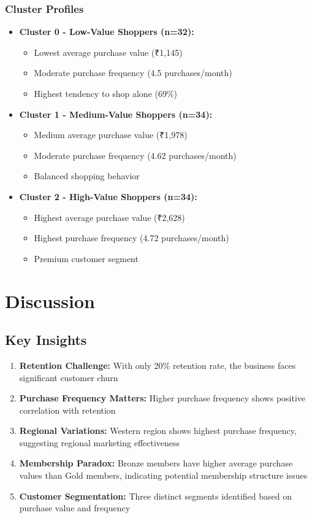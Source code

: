 \documentclass[12pt,a4paper]{article}
\begin{document}
\subsubsection{Cluster Profiles}
\begin{itemize}
    \item \textbf{Cluster 0 - Low-Value Shoppers (n=32):}
    \begin{itemize}
        \item Lowest average purchase value (₹1,145)
        \item Moderate purchase frequency (4.5 purchases/month)
        \item Highest tendency to shop alone (69\%)
    \end{itemize}
    
    \item \textbf{Cluster 1 - Medium-Value Shoppers (n=34):}
    \begin{itemize}
        \item Medium average purchase value (₹1,978)
        \item Moderate purchase frequency (4.62 purchases/month)
        \item Balanced shopping behavior
    \end{itemize}
    
    \item \textbf{Cluster 2 - High-Value Shoppers (n=34):}
    \begin{itemize}
        \item Highest average purchase value (₹2,628)
        \item Highest purchase frequency (4.72 purchases/month)
        \item Premium customer segment
    \end{itemize}
\end{itemize}

\section{Discussion}

\subsection{Key Insights}
\begin{enumerate}
    \item \textbf{Retention Challenge:} With only 20\% retention rate, the business faces significant customer churn
    \item \textbf{Purchase Frequency Matters:} Higher purchase frequency shows positive correlation with retention
    \item \textbf{Regional Variations:} Western region shows highest purchase frequency, suggesting regional marketing effectiveness
    \item \textbf{Membership Paradox:} Bronze members have higher average purchase values than Gold members, indicating potential membership structure issues
    \item \textbf{Customer Segmentation:} Three distinct segments identified based on purchase value and frequency
\end{enumerate}
\end{document}
